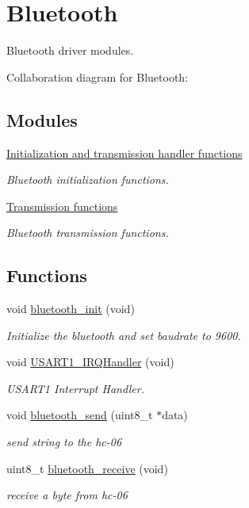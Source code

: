 \hypertarget{group___bluetooth}{}\section{Bluetooth}
\label{group___bluetooth}


Bluetooth driver modules.  


Collaboration diagram for Bluetooth\+:
\subsection*{Modules}
\begin{DoxyCompactItemize}
\item 
\hyperlink{group___bluetooth___init}{Initialization and transmission handler functions}
\begin{DoxyCompactList}\small\item\em Bluetooth initialization functions. \end{DoxyCompactList}\item 
\hyperlink{group___bluetooth___trans}{Transmission functions}
\begin{DoxyCompactList}\small\item\em Bluetooth transmission functions. \end{DoxyCompactList}\end{DoxyCompactItemize}
\subsection*{Functions}
\begin{DoxyCompactItemize}
\item 
void \hyperlink{group___bluetooth_gaaa60810e0857e9e1e5b2cba80b8db3ff}{bluetooth\+\_\+init} (void)
\begin{DoxyCompactList}\small\item\em Initialize the bluetooth and set baudrate to 9600. \end{DoxyCompactList}\item 
void \hyperlink{group___bluetooth_ga7139cd4baabbbcbab0c1fe6d7d4ae1cc}{U\+S\+A\+R\+T1\+\_\+\+I\+R\+Q\+Handler} (void)
\begin{DoxyCompactList}\small\item\em U\+S\+A\+R\+T1 Interrupt Handler. \end{DoxyCompactList}\item 
void \hyperlink{group___bluetooth_ga31d829d5658369ee2c90b9c3cdbedfe1}{bluetooth\+\_\+send} (uint8\+\_\+t $\ast$data)
\begin{DoxyCompactList}\small\item\em send string to the hc-\/06 \end{DoxyCompactList}\item 
uint8\+\_\+t \hyperlink{group___bluetooth_gab7ad1e1b94cf1cedc8a8e5151b0e25cb}{bluetooth\+\_\+receive} (void)
\begin{DoxyCompactList}\small\item\em receive a byte from hc-\/06 \end{DoxyCompactList}\end{DoxyCompactItemize}


